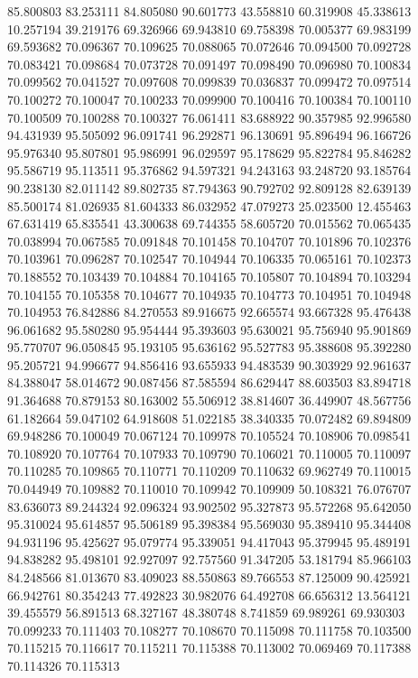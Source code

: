 85.800803
83.253111
84.805080
90.601773
43.558810
60.319908
45.338613
10.257194
39.219176
69.326966
69.943810
69.758398
70.005377
69.983199
69.593682
70.096367
70.109625
70.088065
70.072646
70.094500
70.092728
70.083421
70.098684
70.073728
70.091497
70.098490
70.096980
70.100834
70.099562
70.041527
70.097608
70.099839
70.036837
70.099472
70.097514
70.100272
70.100047
70.100233
70.099900
70.100416
70.100384
70.100110
70.100509
70.100288
70.100327
76.061411
83.688922
90.357985
92.996580
94.431939
95.505092
96.091741
96.292871
96.130691
95.896494
96.166726
95.976340
95.807801
95.986991
96.029597
95.178629
95.822784
95.846282
95.586719
95.113511
95.376862
94.597321
94.243163
93.248720
93.185764
90.238130
82.011142
89.802735
87.794363
90.792702
92.809128
82.639139
85.500174
81.026935
81.604333
86.032952
47.079273
25.023500
12.455463
67.631419
65.835541
43.300638
69.744355
58.605720
70.015562
70.065435
70.038994
70.067585
70.091848
70.101458
70.104707
70.101896
70.102376
70.103961
70.096287
70.102547
70.104944
70.106335
70.065161
70.102373
70.188552
70.103439
70.104884
70.104165
70.105807
70.104894
70.103294
70.104155
70.105358
70.104677
70.104935
70.104773
70.104951
70.104948
70.104953
76.842886
84.270553
89.916675
92.665574
93.667328
95.476438
96.061682
95.580280
95.954444
95.393603
95.630021
95.756940
95.901869
95.770707
96.050845
95.193105
95.636162
95.527783
95.388608
95.392280
95.205721
94.996677
94.856416
93.655933
94.483539
90.303929
92.961637
84.388047
58.014672
90.087456
87.585594
86.629447
88.603503
83.894718
91.364688
70.879153
80.163002
55.506912
38.814607
36.449907
48.567756
61.182664
59.047102
64.918608
51.022185
38.340335
70.072482
69.894809
69.948286
70.100049
70.067124
70.109978
70.105524
70.108906
70.098541
70.108920
70.107764
70.107933
70.109790
70.106021
70.110005
70.110097
70.110285
70.109865
70.110771
70.110209
70.110632
69.962749
70.110015
70.044949
70.109882
70.110010
70.109942
70.109909
50.108321
76.076707
83.636073
89.244324
92.096324
93.902502
95.327873
95.572268
95.642050
95.310024
95.614857
95.506189
95.398384
95.569030
95.389410
95.344408
94.931196
95.425627
95.079774
95.339051
94.417043
95.379945
95.489191
94.838282
95.498101
92.927097
92.757560
91.347205
53.181794
85.966103
84.248566
81.013670
83.409023
88.550863
89.766553
87.125009
90.425921
66.942761
80.354243
77.492823
30.982076
64.492708
66.656312
13.564121
39.455579
56.891513
68.327167
48.380748
8.741859
69.989261
69.930303
70.099233
70.111403
70.108277
70.108670
70.115098
70.111758
70.103500
70.115215
70.116617
70.115211
70.115388
70.113002
70.069469
70.117388
70.114326
70.115313
